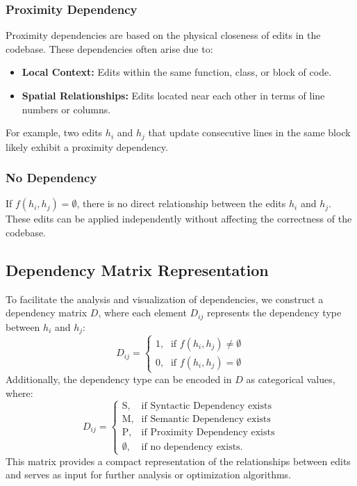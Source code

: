 \subsubsection{Proximity Dependency}
Proximity dependencies are based on the physical closeness of edits in the codebase. These dependencies often arise due to:
\begin{itemize}
    \item \textbf{Local Context:} Edits within the same function, class, or block of code.
    \item \textbf{Spatial Relationships:} Edits located near each other in terms of line numbers or columns.
\end{itemize}
For example, two edits \( h_i \) and \( h_j \) that update consecutive lines in the same block likely exhibit a proximity dependency.

\subsubsection{No Dependency}
If \( f(h_i, h_j) = \emptyset \), there is no direct relationship between the edits \( h_i \) and \( h_j \). These edits can be applied independently without affecting the correctness of the codebase.

\subsection{Dependency Matrix Representation}
To facilitate the analysis and visualization of dependencies, we construct a dependency matrix \( D \), where each element \( D_{ij} \) represents the dependency type between \( h_i \) and \( h_j \):
\[
D_{ij} =
\begin{cases}
    \text{1}, & \text{if } f(h_i, h_j) \neq \emptyset \\
    \text{0}, & \text{if } f(h_i, h_j) = \emptyset
\end{cases}
\]
Additionally, the dependency type can be encoded in \( D \) as categorical values, where:
\[
D_{ij} =
\begin{cases}
    \text{S}, & \text{if Syntactic Dependency exists} \\
    \text{M}, & \text{if Semantic Dependency exists} \\
    \text{P}, & \text{if Proximity Dependency exists} \\
    \emptyset, & \text{if no dependency exists.}
\end{cases}
\]
This matrix provides a compact representation of the relationships between edits and serves as input for further analysis or optimization algorithms.


